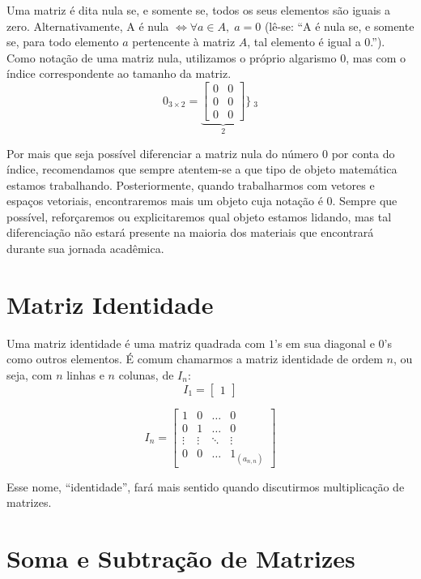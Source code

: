 \documentclass[
  letterpaper,
  DIV=11,
  numbers=noendperiod]{scrreprt}
\begin{document}
Uma matriz é dita nula se, e somente se, todos os seus elementos são
iguais a zero. Alternativamente, A é nula
\(\Leftrightarrow \forall a \in A, \; a = 0\) (lê-se: ``A é nula se, e
somente se, para todo elemento \(a\) pertencente à matriz \(A\), tal
elemento é igual a \(0\).''). Como notação de uma matriz nula,
utilizamos o próprio algarismo 0, mas com o índice correspondente ao
tamanho da matriz. \[
0_{3\times 2}=
\underbrace{\begin{bmatrix}
    0 & 0  \\
    0 & 0  \\
    0 & 0
\end{bmatrix}}_{2}\Bigg\} ~_{3}
\]

Por mais que seja possível diferenciar a matriz nula do número \(0\) por
conta do índice, recomendamos que sempre atentem-se a que tipo de objeto
matemática estamos trabalhando. Posteriormente, quando trabalharmos com
vetores e espaços vetoriais, encontraremos mais um objeto cuja notação é
\(0\). Sempre que possível, reforçaremos ou explicitaremos qual objeto
estamos lidando, mas tal diferenciação não estará presente na maioria
dos materiais que encontrará durante sua jornada acadêmica.

\section{Matriz Identidade}\label{matriz-identidade}

Uma matriz identidade é uma matriz quadrada com \(1\)'s em sua diagonal
e \(0\)'s como outros elementos. É comum chamarmos a matriz identidade
de ordem \(n\), ou seja, com \(n\) linhas e \(n\) colunas, de \(I_n\):
\[
I_{1} = 
\begin{bmatrix}
1
\end{bmatrix}
\]

\[
I_{n} =
\begin{bmatrix}
    1 & 0 & \dots & 0 \\
    0 & 1 & \dots & 0 \\
    \vdots  & \vdots & \ddots & \vdots \\
    0 & 0 & \dots & 1_{(a_{n,n})}
\end{bmatrix}
\]

Esse nome, ``identidade'', fará mais sentido quando discutirmos
multiplicação de matrizes.

\section{Soma e Subtração de
Matrizes}\label{soma-e-subtrauxe7uxe3o-de-matrizes}
\end{document}
